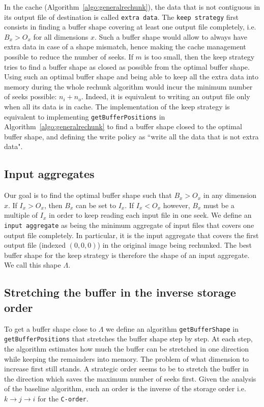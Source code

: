 \documentclass[conference]{IEEEtran}
\begin{document}
In the cache (Algorithm~\ref{algo:generalrechunk}), the data that is not
contiguous in its output file of destination is called \texttt{extra data}.
The \texttt{keep strategy} first consists in finding a buffer shape covering at least
one output file completely, i.e. $B_x>O_x$ for all dimensions $x$.
Such a buffer shape would allow to always have extra data in case of a shape
mismatch, hence making the cache management possible to reduce the number of seeks.
If $m$ is too small, then the keep strategy tries to find a buffer
shape as closed as possible from the optimal buffer shape. Using such an optimal
buffer shape and being able to keep all the extra data into memory during the
whole rechunk algorithm would incur the minimum number of seeks possible: $n_i + n_o$.
Indeed, it is equivalent to writing an output file only when all its data is in
cache.
The implementation of the keep strategy is equivalent to implementing
\texttt{getBufferPositions} in Algorithm~\ref{algo:generalrechunk} to find a
buffer shape closed to the optimal buffer shape, and defining the write policy
as ``write all the data that is not extra data".

\subsection{Input aggregates}
Our goal is to find the optimal buffer shape such that $B_x>O_x$ in any dimension $x$.
If $I_x > O_x$, then $B_x$ can be set to $I_x$. If $I_x < O_x$ however, $B_x$
must be a multiple of $I_x$ in order to keep reading each input file in one seek.
We define an \texttt{input aggregate} as being the minimum aggregate of input files that
covers one output file completely. In particular, it is the input aggregate that
covers the first output file (indexed $(0,0,0)$) in the original image being
rechunked. The best buffer shape for the keep strategy is therefore the shape of
an input aggregate. We call this shape $\Lambda$.

\subsection{Stretching the buffer in the inverse storage order}
To get a buffer shape close to $\Lambda$ we define an algorithm
\texttt{getBufferShape} in \texttt{getBufferPositions} that stretches the
buffer shape step by step. At each step, the algorithm estimates how much the
buffer can be stretched in one direction while keeping the remainders into
memory. The problem of what dimension to increase first still stands. A
strategic order seems to be to stretch the buffer in the direction which saves
the maximum number of seeks first. Given the analysis of the baseline algorithm,
such an order is the inverse of the storage order i.e.
$k \rightarrow j \rightarrow i$ for the \texttt{C-order}.
\end{document}
